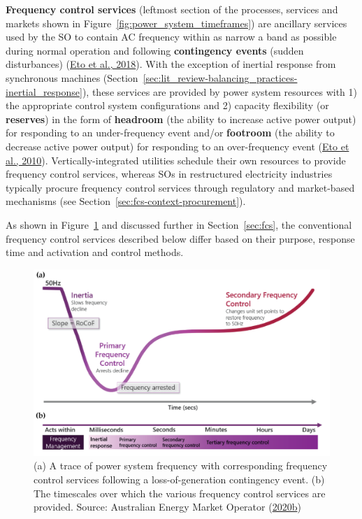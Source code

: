 \documentclass[12pt,a4paper,]{report}
\begin{document}
\textbf{Frequency control services} (leftmost section of the processes,
services and markets shown in Figure~\ref{fig:power_system_timeframes})
are ancillary services used by the SO to contain AC frequency within as
narrow a band as possible during normal operation and following
\textbf{contingency events} (sudden disturbances)
(\protect\hyperlink{ref-etoFrequencyControlRequirements2018}{Eto et al.,
2018}). With the exception of inertial response from synchronous
machines
(Section~\ref{sec:lit_review-balancing_practices-inertial_response}),
these services are provided by power system resources with 1) the
appropriate control system configurations and 2) capacity flexibility
(or \textbf{reserves}) in the form of \textbf{headroom} (the ability to
increase active power output) for responding to an under-frequency event
and/or \textbf{footroom} (the ability to decrease active power output)
for responding to an over-frequency event
(\protect\hyperlink{ref-etoUseFrequencyResponse2010}{Eto et al., 2010}).
Vertically-integrated utilities schedule their own resources to provide
frequency control services, whereas SOs in restructured electricity
industries typically procure frequency control services through
regulatory and market-based mechanisms (see
Section~\ref{sec:fcs-context-procurement}).

As shown in Figure~\ref{fig:freq_control} and discussed further in
Section~\ref{sec:fcs}, the conventional frequency control services
described below differ based on their purpose, response time and
activation and control methods.

\begin{figure}
\hypertarget{fig:freq_control}{%
\centering
\includegraphics{source/figures/freq_control_timeframes.png}
\caption[Sequence and timescales of typical frequency control
services]{(a) A trace of power system frequency with corresponding
frequency control services following a loss-of-generation contingency
event. (b) The timescales over which the various frequency control
services are provided. Source: Australian Energy Market Operator
(\protect\hyperlink{ref-australianenergymarketoperatorPowerSystemRequirements2020}{2020b})}\label{fig:freq_control}
}
\end{figure}
\end{document}

